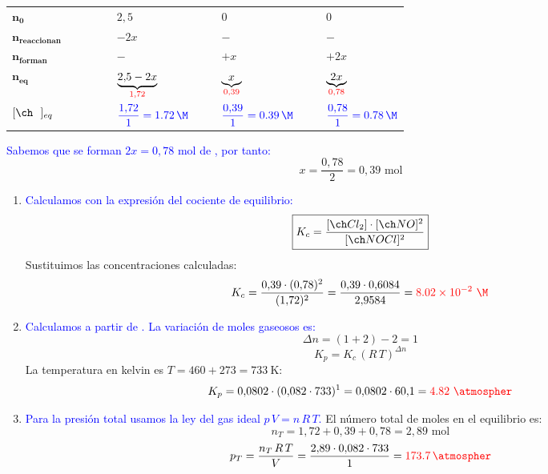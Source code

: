 \begin{exerciseEVAU}
\begin{solu}
\begin{table}[H]
\begin{tabular}{@{}C{0.21\linewidth} @{\,}c@{\,} C{0.21\linewidth} @{\,}c@{\,} C{0.21\linewidth} @{\,}c@{\,} C{0.21\linewidth}@{}}
                \midrule
                \(\bm{n_0}\) &  & \(2{,}5\) &  & \(0\) &  & \(0\) \\[3pt]
                \(\bm{n_{\text{reaccionan}}}\) &  & \(-2x\) &  & \(-\) &  & \(-\) \\[3pt]
                \(\bm{n_{\text{forman}}}\) &  & \(-\) &  & \(+x\) &  & \(+2x\) \\[3pt]
                \(\bm{n_{\text{eq}}}\) &  & \(\underbrace{2{,}5-2x}_{{\color{red}1{,}72}}\) &  & \(\underbrace{x}_{{\color{red}0{,}39}}\) &  & \(\underbrace{2x}_{{\color{red}0{,}78}}\) \\[3pt]
                \(\conc{\ \ }_{eq}\) &  & \({\color{blue}\dfrac{1{,}72}{1} = \qty{1{,}72}{\M}}\) &  & \({\color{blue}\dfrac{0{,}39}{1} = \qty{0{,}39}{\M}}\) &  & \({\color{blue}\dfrac{0{,}78}{1} = \qty{0{,}78}{\M}}\) \\
                \bottomrule
            \end{tabular}
        \end{table}

    \textcolor{blue}{Sabemos que se forman \(2x = 0{,}78\) mol de , por tanto:}
    \[
        x = \frac{0{,}78}{2} = 0{,}39 \text{ mol}
    \]

    \begin{enumerate}[label=\letraminuscula]
        \item \textcolor{blue}{Calculamos \Kc{} con la expresión del cociente de equilibrio:}
        \[
            \boxed{K_c = \frac{\conc{Cl_2}\cdot\conc{NO}^2}{\conc{NOCl}^2}}
        \]
        Sustituimos las concentraciones calculadas:
        \[
            K_c = \frac{0{,}39 \cdot (0{,}78)^2}{(1{,}72)^2} = \frac{0{,}39 \cdot 0{,}6084}{2{,}9584} = \textcolor{red}{\num{8,02e-2}\ \unit{\M}}
        \]

        \item \textcolor{blue}{Calculamos \Kp{} a partir de \Kc{}. La variación de moles gaseosos es:}
        \[
            \Delta n = (1+2) - 2 = 1
        \]
        \[
            \boxed{K_p = K_c\,(R\,T)^{\Delta n}}
        \]
        La temperatura en kelvin es \(T = 460 + 273 = \qty{733}{\K}\):
        \[
            K_p = 0{,}0802 \cdot (0{,}082 \cdot 733)^{1} = 0{,}0802 \cdot 60{,}1 = \textcolor{red}{\num{4,82}\ \unit{\atmospher}}
        \]

        \item \textcolor{blue}{Para la presión total usamos la ley del gas ideal \(p\,V = n\,R\,T\).}
        El número total de moles en el equilibrio es:
        \[
            n_T = 1{,}72 + 0{,}39 + 0{,}78 = 2{,}89 \text{ mol}
        \]
        \[
            p_T = \frac{n_T\,R\,T}{V} = \frac{2{,}89 \cdot 0{,}082 \cdot 733}{1} = \textcolor{red}{\qty{173,7}{\atmospher}}
        \]
    \end{enumerate}

    \end{solu}
\end{exerciseEVAU}


